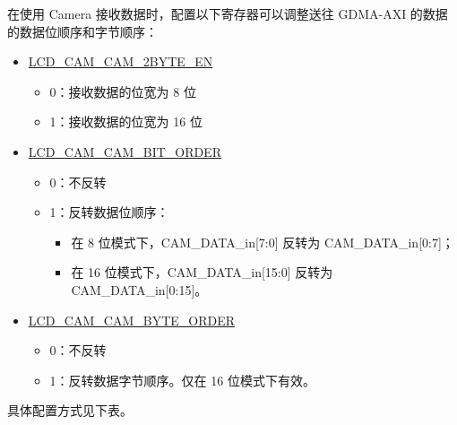 \documentclass[main\_\_CN.tex]{subfiles}
\begin{document}
在使用 Camera 接收数据时，配置以下寄存器可以调整送往 GDMA-AXI 的数据的数据位顺序和字节顺序：

\begin{itemize}
    \item \hyperref[fielddesc:LCDCAMCAM2BYTEEN]{LCD\_CAM\_CAM\_2BYTE\_EN}
    \begin{itemize}
        \item 0：接收数据的位宽为 8 位
        \item 1：接收数据的位宽为 16 位
    \end{itemize}
    \item \hyperref[fielddesc:LCDCAMCAMBITORDER]{LCD\_CAM\_CAM\_BIT\_ORDER}
    \begin{itemize}
        \item 0：不反转
        \item 1：反转数据位顺序：
        \begin{itemize}
            \item 在 8 位模式下，CAM\_DATA\_in[7:0] 反转为 CAM\_DATA\_in[0:7]；
            \item 在 16 位模式下，CAM\_DATA\_in[15:0] 反转为 CAM\_DATA\_in[0:15]。
        \end{itemize}
    \end{itemize}
    \item \hyperref[fielddesc:LCDCAMCAMBYTEORDER]{LCD\_CAM\_CAM\_BYTE\_ORDER}
    \begin{itemize}
        \item 0：不反转
        \item 1：反转数据字节顺序。仅在 16 位模式下有效。
    \end{itemize}
\end{itemize}

具体配置方式见下表。
\end{document}
